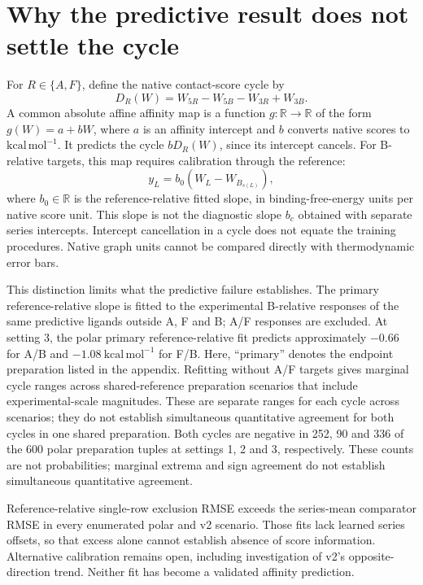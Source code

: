 \documentclass{article}
\begin{document}
\section{Why the predictive result does not settle the cycle}

For \(R\in\{A,F\}\), define the native contact-score cycle by
\[
 D_R(W)=W_{5R}-W_{5B}-W_{3R}+W_{3B}.
\]
A common absolute affine affinity map is a function \(g:\mathbb R\to\mathbb R\) of the form \(g(W)=a+bW\), where \(a\) is an affinity intercept and \(b\) converts native scores to \(\mathrm{kcal\,mol^{-1}}\). It predicts the cycle \(bD_R(W)\), since its intercept cancels. For B-relative targets, this map requires calibration through the reference:
\[
 y_L=b_0(W_L-W_{B_{s(L)}}),
\]
where \(b_0\in\mathbb R\) is the reference-relative fitted slope, in binding-free-energy units per native score unit. This slope is not the diagnostic slope \(b_c\) obtained with separate series intercepts. Intercept cancellation in a cycle does not equate the training procedures. Native graph units cannot be compared directly with thermodynamic error bars.

This distinction limits what the predictive failure establishes. The primary reference-relative slope is fitted to the experimental B-relative responses of the same predictive ligands outside A, F and B; A/F responses are excluded. At setting 3, the polar primary reference-relative fit predicts approximately \(-0.66\) for A/B and \(-1.08\ \mathrm{kcal\,mol^{-1}}\) for F/B. Here, ``primary'' denotes the endpoint preparation listed in the appendix. Refitting without A/F targets gives marginal cycle ranges across shared-reference preparation scenarios that include experimental-scale magnitudes. These are separate ranges for each cycle across scenarios; they do not establish simultaneous quantitative agreement for both cycles in one shared preparation. Both cycles are negative in 252, 90 and 336 of the 600 polar preparation tuples at settings 1, 2 and 3, respectively. These counts are not probabilities; marginal extrema and sign agreement do not establish simultaneous quantitative agreement.

Reference-relative single-row exclusion RMSE exceeds the series-mean comparator RMSE in every enumerated polar and v2 scenario. Those fits lack learned series offsets, so that excess alone cannot establish absence of score information. Alternative calibration remains open, including investigation of v2's opposite-direction trend. Neither fit has become a validated affinity prediction.
\end{document}
